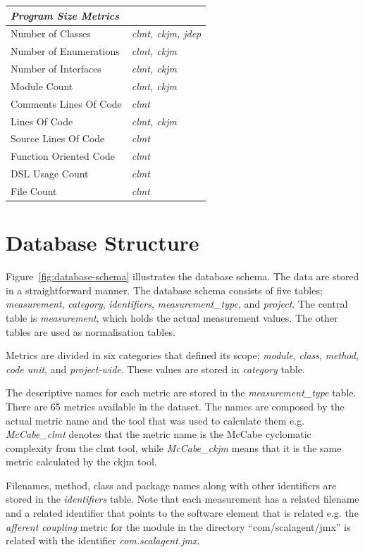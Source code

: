 \documentclass{sig-alternate}
\begin{document}
\begin{table}
\begin{tabular}{l l}
\hline
\multicolumn{2}{l}{\textit{\textbf{Program Size Metrics}}}\\
\hline
Number of Classes & \textit{clmt, ckjm, jdep}\\
Number of Enumerations & \textit{clmt, ckjm}\\
Number of Interfaces & \textit{clmt, ckjm}\\
Module Count & \textit{clmt, ckjm}\\
Comments Lines Of Code & \textit{clmt}\\
Lines Of Code & \textit{clmt, ckjm}\\
Source Lines Of Code & \textit{clmt}\\
Function Oriented Code & \textit{clmt}\\
DSL Usage Count & \textit{clmt}\\
File Count & \textit{clmt}\\
\hline
\end{tabular}
\end{table}

\section{Database Structure}
\label{sec:db}

Figure~\ref{fig:database-schema} illustrates the database schema. The data are stored in a straightforward manner. The database schema consists of five tables; \textit{measurement}, \textit{category}, \textit{identifiers}, \textit{measurement\_type}, and \textit{project}. The central table is \textit{measurement}, which holds the actual measurement values. The other tables are used as normalisation tables.

Metrics are divided in six categories that defined its scope; \textit{module}, \textit{class}, \textit{method}, \textit{code unit}, and \textit{project-wide}. These values are stored in \textit{category} table.

The descriptive names for each metric are stored in the \textit{measurement\_type} table. There are 65 metrics available in the dataset. The names are composed by the actual metric name and the tool that was used to calculate them e.g. \textit{McCabe\_clmt} denotes that the metric name is the McCabe cyclomatic complexity from the clmt tool, while \textit{McCabe\_ckjm} means that it is the same metric calculated by the ckjm tool.

Filenames, method, class and package names along with other identifiers are stored in the \textit{identifiers} table. Note that each measurement has a related filename and a related identifier that points to the software element that is related e.g. the \textit{afferent coupling} metric for the module in the directory ``com/scalagent/jmx'' is related with the identifier \textit{com.scalagent.jmx}.
\end{document}
